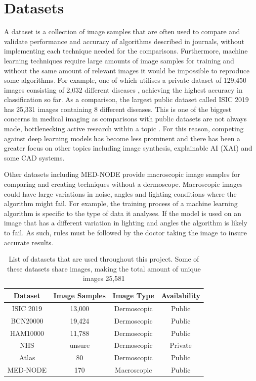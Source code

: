 \documentclass[12pt]{report}
\begin{document}
\section{Datasets}
A dataset is a collection of image samples that are often used to compare and validate performance and accuracy of algorithms described in journals, without implementing each technique needed for the comparisons.  Furthermore, machine learning techniques require large amounts of image samples for training and without the same amount of relevant images it would be impossible to reproduce some algorithms. For example, one of which utilises a private dataset of 129,450 images consisting of 2,032 different diseases \cite{Andre2017}, achieving the highest accuracy in classification so far. As a comparison, the largest public dataset called ISIC 2019 has 25,331 images containing 8 different diseases. This is one of the biggest concerns in medical imaging as comparisons with public datasets are not always made, bottlenecking active research within a topic \cite{Roh2019}. For this reason, competing against deep learning models has become less prominent and there has been a greater focus on other topics including image synthesis, explainable AI (XAI) and some CAD systems.

Other datasets including MED-NODE \cite{Argenziano2001} provide macroscopic image samples for comparing and creating techniques without a dermoscope. Macroscopic images could have large variations in noise, angles and lighting conditions where the algorithm might fail. For example, the training process of a machine learning algorithm is specific to the type of data it analyses. If the model is used on an image that has a different variation in lighting and angles the algorithm is likely to fail. As such, rules must be followed by the doctor taking the image to insure accurate results.

\begin{table}
\centering
\begin{tabular}{|c|c|c|c|}
	\hline
	Dataset & Image Samples & Image Type & Availability\\
	\hline
	ISIC 2019 & 13,000 & Dermoscopic & Public  \\
	\hline
	BCN20000 & 19,424 & Dermoscopic & Public \\
	\hline
	HAM10000 & 11,788 & Dermoscopic & Public  \\
	\hline
	NHS & unsure & Dermoscopic & Private \\
	\hline
	Atlas & 80 & Dermoscopic & Public \\
	\hline
	MED-NODE & 170 & Macroscopic & Public \\
	\hline
	
\end{tabular}
\caption{List of datasets that are used throughout this project. Some of these datasets share images, making the total amount of unique images 25,581}
\end{table}
\end{document}
